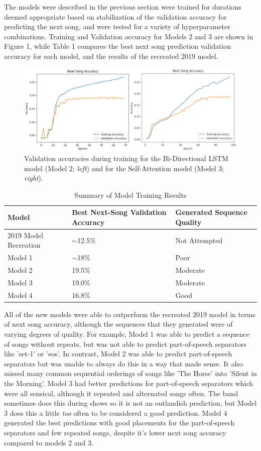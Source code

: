\documentclass{article}
\begin{document}
The models were described in the previous section were trained for durations deemed appropriate based on stabilization of the validation accuracy for predicting the next song, and were tested for a variety of hyperparameter combinations. Training and Validation accuracy for Models 2 and 3 are shown in Figure 1, while Table 1 compares the best next song prediction validation accuracy for each model, and the results of the recreated 2019 model.

\begin{figure}
	\centering
	\includegraphics[width=\textwidth]{images/graph_attention_acc.png}
	\caption{Validation accuracies during training for the Bi-Directional LSTM model (Model 2; \emph{left}) and for the Self-Attention model (Model 3; \emph{right}).}
\end{figure}

\begin{table}
	\caption{Summary of Model Training Results}
	\label{results-table}
	\centering
	\begin{tabular}{lll}
		\toprule
		Model & Best Next-Song Validation Accuracy & Generated Sequence Quality \\
		\midrule
		2019 Model Recreation & $\sim$12.5\% & Not Attempted \\
		Model 1 & $\sim$18\% & Poor \\
		Model 2 & 19.5\% & Moderate \\
		Model 3 & 19.0\% & Moderate \\
		Model 4 & 16.8\% & Good \\
		\bottomrule
	\end{tabular}
\end{table}

All of the new models were able to outperform the recreated 2019 model in terms of next song accuracy, although the sequences that they generated were of varying degrees of quality. For example, Model 1 was able to predict a sequence of songs without repeats, but was not able to predict part-of-speech separators like 'set-1' or 'eos'. In contrast, Model 2 was able to predict part-of-speech separators but was unable to always do this in a way that made sense. It also missed many common sequential orderings of songs like 'The Horse' into 'Silent in the Morning'. Model 3 had better predictions for part-of-speech separators which were all sensical, although it repeated and alternated songs often. The band sometimes does this during shows so it is not an outlandish prediction, but Model 3 does this a little \emph{too} often to be considered a good prediction. Model 4 generated the best predictions with good placements for the part-of-speech separators and few repeated songs, despite it's lower next song accuracy compared to models 2 and 3. 
\end{document}
